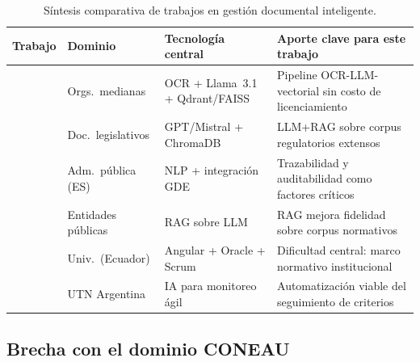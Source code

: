 \begin{table}[htb]
\centering
\small
\setlength{\extrarowheight}{4pt}
\caption{Síntesis comparativa de trabajos en gestión documental inteligente.}
\label{tab:gdi_comparativa}
\begin{tabularx}{\textwidth}{p{3.0cm}p{2.4cm}XX}
\toprule
\textbf{Trabajo} & \textbf{Dominio} & \textbf{Tecnología central} & \textbf{Aporte clave para este trabajo} \\
\midrule
\citet{cascavita2025sistema}      & Orgs.\ medianas       & OCR + Llama~3.1 + Qdrant/FAISS & Pipeline OCR-LLM-vectorial sin costo de licenciamiento \\
\arrayrulecolor{gray!35}\hline\arrayrulecolor{black}
\citet{torres2024desarrollo}      & Doc.\ legislativos    & GPT/Mistral + ChromaDB         & LLM+RAG sobre corpus regulatorios extensos \\
\arrayrulecolor{gray!35}\hline\arrayrulecolor{black}
\citet{paun2025implementacion}    & Adm.\ pública (ES)   & NLP + integración GDE          & Trazabilidad y auditabilidad como factores críticos \\
\arrayrulecolor{gray!35}\hline\arrayrulecolor{black}
\citet{collado2024implementacion} & Entidades públicas    & RAG sobre LLM                  & RAG mejora fidelidad sobre corpus normativos \\
\arrayrulecolor{gray!35}\hline\arrayrulecolor{black}
\citet{cruz2024diseno}            & Univ.\ (Ecuador)      & Angular + Oracle + Scrum       & Dificultad central: marco normativo institucional \\
\arrayrulecolor{gray!35}\hline\arrayrulecolor{black}
\citet{tortosasistemas}           & UTN Argentina         & IA para monitoreo ágil         & Automatización viable del seguimiento de criterios \\
\bottomrule
\end{tabularx}
\end{table}

\subsection{Brecha con el dominio CONEAU}

